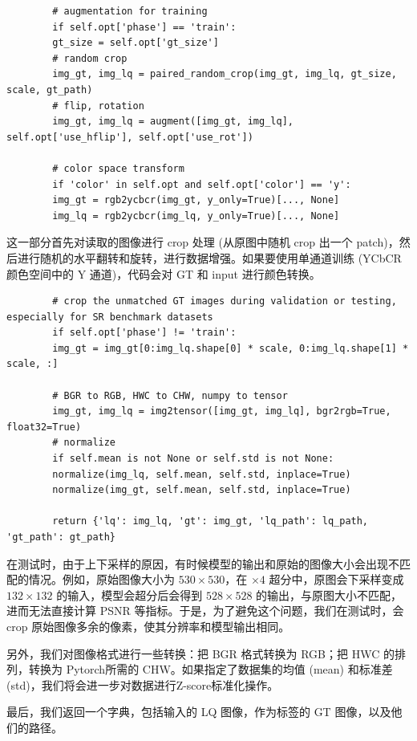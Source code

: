 \documentclass[../main.tex]{subfiles}
\begin{document}
	\begin{verbatim}
		# augmentation for training
		if self.opt['phase'] == 'train':
		gt_size = self.opt['gt_size']
		# random crop
		img_gt, img_lq = paired_random_crop(img_gt, img_lq, gt_size, scale, gt_path)
		# flip, rotation
		img_gt, img_lq = augment([img_gt, img_lq], self.opt['use_hflip'], self.opt['use_rot'])
		
		# color space transform
		if 'color' in self.opt and self.opt['color'] == 'y':
		img_gt = rgb2ycbcr(img_gt, y_only=True)[..., None]
		img_lq = rgb2ycbcr(img_lq, y_only=True)[..., None]
	\end{verbatim}
	
	这一部分首先对读取的图像进行 crop 处理 (从原图中随机 crop 出一个 patch)，然后进行随机的水平翻转和旋转，进行数据增强。如果要使用单通道训练 (YCbCR 颜色空间中的 Y 通道)，代码会对 GT 和 input 进行颜色转换。
	
	\begin{verbatim}
		# crop the unmatched GT images during validation or testing, especially for SR benchmark datasets
		if self.opt['phase'] != 'train':
		img_gt = img_gt[0:img_lq.shape[0] * scale, 0:img_lq.shape[1] * scale, :]
		
		# BGR to RGB, HWC to CHW, numpy to tensor
		img_gt, img_lq = img2tensor([img_gt, img_lq], bgr2rgb=True, float32=True)
		# normalize
		if self.mean is not None or self.std is not None:
		normalize(img_lq, self.mean, self.std, inplace=True)
		normalize(img_gt, self.mean, self.std, inplace=True)
		
		return {'lq': img_lq, 'gt': img_gt, 'lq_path': lq_path, 'gt_path': gt_path}
	\end{verbatim}
	
	在测试时，由于上下采样的原因，有时候模型的输出和原始的图像大小会出现不匹配的情况。例如，原始图像大小为 $530 \times 530$，在 $\times 4$  超分中，原图会下采样变成 $132 \times 132$ 的输入，模型会超分后会得到 $528 \times 528$ 的输出，与原图大小不匹配，进而无法直接计算 PSNR 等指标。于是，为了避免这个问题，我们在测试时，会 crop 原始图像多余的像素，使其分辨率和模型输出相同。
	
	另外，我们对图像格式进行一些转换：把 BGR 格式转换为 RGB；把 HWC 的排列，转换为 Pytorch所需的 CHW。如果指定了数据集的均值 (mean) 和标准差 (std)，我们将会进一步对数据进行Z-score标准化操作。
	
	最后，我们返回一个字典，包括输入的 LQ 图像，作为标签的 GT 图像，以及他们的路径。
	
\end{document}
